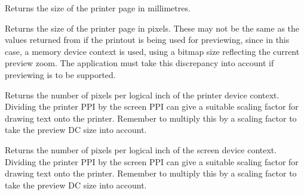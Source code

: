 \label{wxprintoutgetpagesizemm}


Returns the size of the printer page in millimetres.




\label{wxprintoutgetpagesizepixels}


Returns the size of the printer page in pixels. These may not be the
same as the values returned from  if
the printout is being used for previewing, since in this case, a
memory device context is used, using a bitmap size reflecting the current
preview zoom. The application must take this discrepancy into account if
previewing is to be supported.




\label{wxprintoutgetppiprinter}


Returns the number of pixels per logical inch of the printer device context.
Dividing the printer PPI by the screen PPI can give a suitable scaling
factor for drawing text onto the printer. Remember to multiply
this by a scaling factor to take the preview DC size into account.




\label{wxprintoutgetppiscreen}


Returns the number of pixels per logical inch of the screen device context.
Dividing the printer PPI by the screen PPI can give a suitable scaling
factor for drawing text onto the printer. Remember to multiply
this by a scaling factor to take the preview DC size into account.


